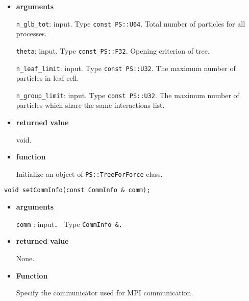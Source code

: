 \begin{itemize}

\item {\bf arguments}

{\tt n\_glb\_tot}: input. Type {\tt const PS::U64}. Total number of particles for all processes.

{\tt theta}: input. Type {\tt const PS::F32}. Opening criterion of tree.

{\tt n\_leaf\_limit}: input. Type {\tt const PS::U32}. The maximum number of particles in leaf cell.

{\tt n\_group\_limit}: input. Type {\tt const PS::U32}. The maximum number of particles which share the same interactions list.

\item {\bf returned value}

void.

\item {\bf function}

Initialize an object of {\tt PS::TreeForForce} class.

\end{itemize}





\begin{screen}
\begin{verbatim}
void setCommInfo(const CommInfo & comm);
\end{verbatim}
\end{screen}

\begin{itemize}

\item {\bf arguments}

{\tt comm} : input． Type {\tt CommInfo \&}．

\item {\bf returned value}

None.

\item {\bf Function}

Specify the communicator used for MPI communication.







\end{itemize}


